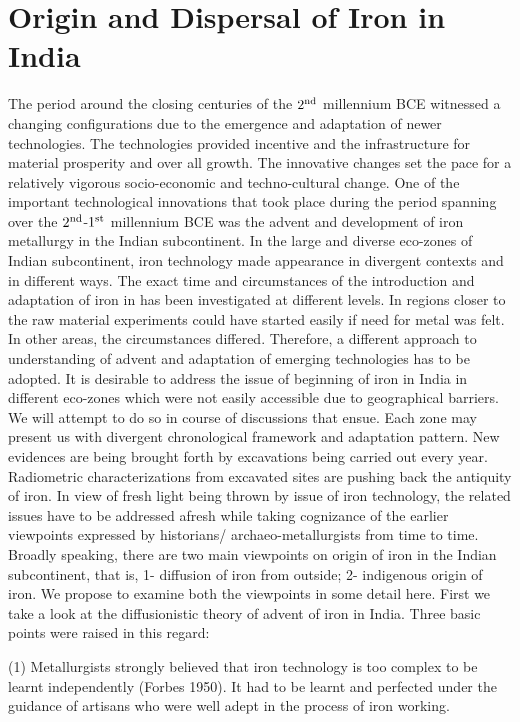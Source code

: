 \chapter{Origin and Dispersal of Iron in India}\label{chapter3}


The period around the closing centuries of the $2^{\rm nd}$ millennium BCE witnessed a changing configurations due to the emergence and adaptation of newer technologies. The technologies provided incentive and the infrastructure for material prosperity and over all growth. The innovative changes set the pace for a relatively vigorous socio-economic and techno-cultural change. One of the important technological innovations that took place during the period spanning over the $2^{\rm nd}$-$1^{\rm st}$ millennium BCE was the advent and development of iron metallurgy in the Indian subcontinent. In the large and diverse eco-zones of Indian subcontinent, iron technology made appearance in divergent contexts and in different ways. The exact time and circumstances of the introduction and adaptation of iron in has been investigated at different levels. In regions closer to the raw material experiments could have started easily if need for metal was felt. In other areas, the circumstances differed. Therefore, a different approach to understanding of advent and adaptation of emerging technologies has to be adopted. It is desirable to address the issue of beginning of iron in India in different eco-zones which were not easily accessible due to geographical barriers. We will attempt to do so in course of discussions that ensue. Each zone may present us with divergent chronological framework and adaptation pattern. New evidences are being brought forth by excavations being carried out every year. Radiometric characterizations from excavated sites are pushing back the antiquity of iron. In view of fresh light being thrown by issue of iron technology, the related issues have to be addressed afresh while taking cognizance of the earlier viewpoints expressed by historians/ archaeo-metallurgists from time to time. Broadly speaking, there are two main viewpoints on origin of iron in the Indian subcontinent, that is, 1- diffusion of iron from outside; 2- indigenous origin of iron. We propose to examine both the viewpoints in some detail here.  First we take a look at the diffusionistic theory of advent of iron in India. Three basic points were raised in this regard:

 (1) Metallurgists strongly believed that iron technology is too complex to be learnt independently (Forbes 1950). It had to be learnt and perfected under the guidance of artisans who were well adept in the process of iron working.
 
